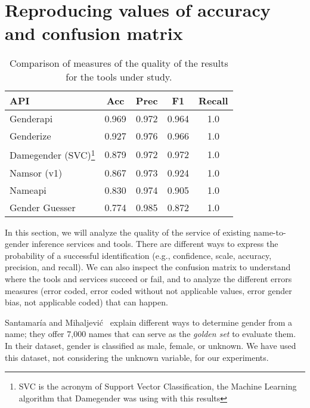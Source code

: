 \documentclass[a4paper]{article}
\begin{document}
\section{Reproducing values of accuracy and confusion matrix}
\label{sec:reproducing}

\begin{table}[t]
\footnotesize
\begin{tabular}[]{lcccc}
  \hline
  API & Acc & Prec & F1 & Recall\tabularnewline
\hline
Genderapi & 0.969 & 0.972 & 0.964 & 1.0\tabularnewline
Genderize & 0.927 & 0.976 & 0.966 & 1.0\tabularnewline
Damegender (SVC)\footnote{SVC is the acronym of Support Vector Classification, the Machine Learning algorithm that Damegender was using with this results} & 0.879 & 0.972 & 0.972 & 1.0\tabularnewline
Namsor (v1) & 0.867 & 0.973 & 0.924 & 1.0\tabularnewline
Nameapi & 0.830 & 0.974 & 0.905 & 1.0\tabularnewline
Gender Guesser & 0.774 & 0.985 & 0.872 & 1.0\tabularnewline
\hline
\end{tabular}
\caption{Comparison of measures of the quality of the results for the tools under study.}
\label{table:DifferentAccuraciesMeasures}
\end{table}

In this section, we will analyze the quality of the service of existing name-to-gender inference services and tools.
There are different ways to express the probability of a successful identification (e.g., confidence, scale, accuracy, precision, and recall).
We can also inspect the confusion matrix to understand where the tools and services succeed or fail, and to analyze the different errors measures (error coded, error coded without not applicable values, error gender bias, not applicable coded) that can happen.

Santamaría and Mihaljevi\'c~\cite{10.7717/peerj-cs.156} explain different ways to determine gender from a name; they offer 7,000 names that can serve as the \emph{golden set} to evaluate them. 
In their dataset, gender is classified as male, female, or unknown. 
We have used this dataset, not considering the unknown variable, for our experiments.
\end{document}
